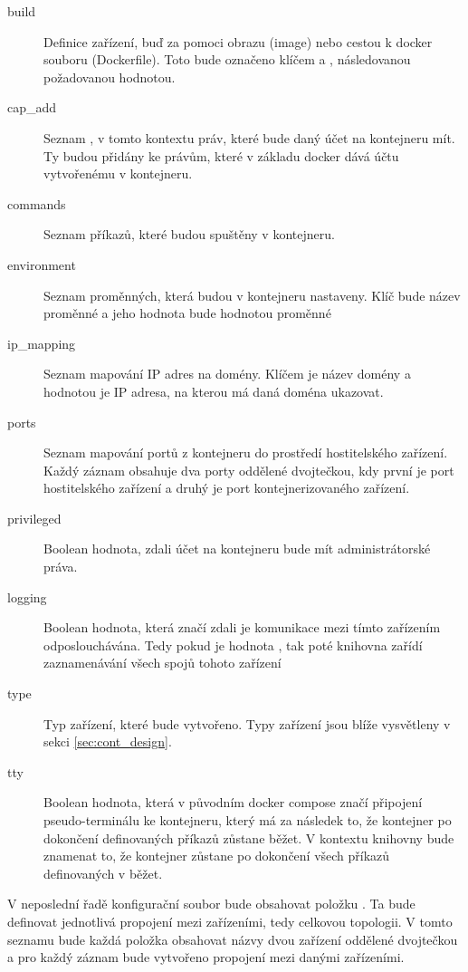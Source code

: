 \begin{description}
    \item[build] Definice zařízení, buď za pomoci obrazu (image) nebo cestou k docker souboru (Dockerfile). Toto bude označeno klíčem  a , následovanou požadovanou hodnotou.
    \item[cap\_add] Seznam , v tomto kontextu práv, které bude daný účet na kontejneru mít. Ty budou přidány ke právům, které v základu docker dává účtu vytvořenému v kontejneru. 
    \item[commands] Seznam příkazů, které budou spuštěny v kontejneru.
    \item[environment] Seznam proměnných, která budou v kontejneru nastaveny. Klíč bude název proměnné a jeho hodnota bude hodnotou proměnné
    \item[ip\_mapping] Seznam mapování IP adres na domény. Klíčem je název domény a hodnotou je IP adresa, na kterou má daná doména ukazovat.
    \item[ports] Seznam mapování portů z kontejneru do prostředí hostitelského zařízení. Každý záznam obsahuje dva porty oddělené dvojtečkou, kdy první je port hostitelského zařízení a druhý je port kontejnerizovaného zařízení.
    \item[privileged] Boolean hodnota, zdali účet na kontejneru bude mít administrátorské práva.
    \item[logging] Boolean hodnota, která značí zdali je komunikace mezi tímto zařízením odposlouchávána. Tedy pokud je hodnota , tak poté knihovna zařídí zaznamenávání všech spojů tohoto zařízení
    \item[type] Typ zařízení, které bude vytvořeno. Typy zařízení jsou blíže vysvětleny v sekci \ref{sec:cont_design}.
    \item[tty] Boolean hodnota, která v původním docker compose značí připojení pseudo-terminálu ke kontejneru, který má za následek to, že kontejner po dokončení definovaných příkazů zůstane běžet. V kontextu knihovny bude znamenat to, že kontejner zůstane po dokončení všech příkazů definovaných v  běžet. 
\end{description}

V neposlední řadě konfigurační soubor bude obsahovat položku . Ta bude definovat jednotlivá propojení mezi zařízeními, tedy celkovou topologii. V tomto seznamu bude každá položka obsahovat názvy dvou zařízení oddělené dvojtečkou a pro každý záznam bude vytvořeno propojení mezi danými zařízeními.

